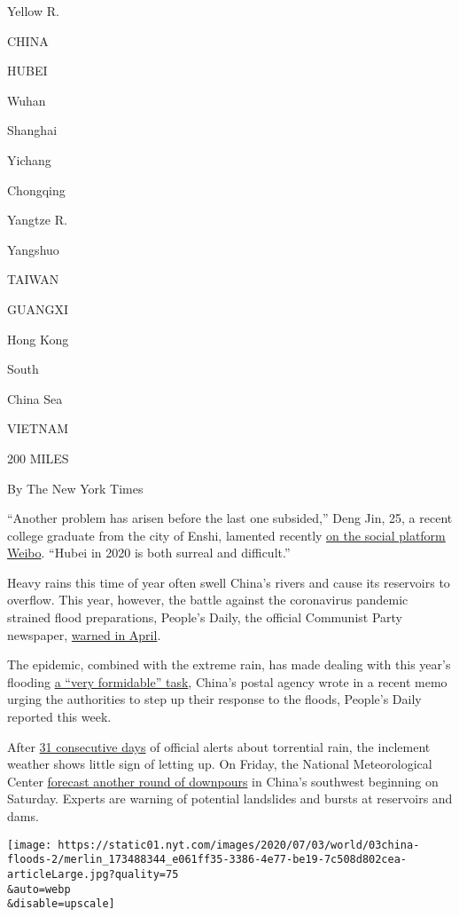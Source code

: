 Yellow R.

CHINA

HUBEI

Wuhan

Shanghai

Yichang

Chongqing

Yangtze R.

Yangshuo

TAIWAN

GUANGXI

Hong Kong

South

China Sea

VIETNAM

200 MILES

By The New York Times

``Another problem has arisen before the last one subsided,'' Deng Jin,
25, a recent college graduate from the city of Enshi, lamented recently
\href{https://m.weibo.cn/status/4520707848175659?}{on the social
platform Weibo}. ``Hubei in 2020 is both surreal and difficult.''

Heavy rains this time of year often swell China's rivers and cause its
reservoirs to overflow. This year, however, the battle against the
coronavirus pandemic strained flood preparations, People's Daily, the
official Communist Party newspaper,
\href{http://paper.people.com.cn/rmrb/html/2020-04/17/nw.D110000renmrb_20200417_3-06.htm}{warned
in April}.

The epidemic, combined with the extreme rain, has made dealing with this
year's flooding
\href{http://m.people.cn/n4/2020/0701/c175-14102526.html}{a ``very
formidable'' task}, China's postal agency wrote in a recent memo urging
the authorities to step up their response to the floods, People's Daily
reported this week.

After \href{https://mp.weixin.qq.com/s/a9pJCMb7WM5T52jXpJMHeQ}{31
consecutive days} of official alerts about torrential rain, the
inclement weather shows little sign of letting up. On Friday, the
National Meteorological Center
\href{http://www.nmc.cn/publish/weather-bulletin/index.htm}{forecast
another round of downpours} in China's southwest beginning on Saturday.
Experts are warning of potential landslides and bursts at reservoirs and
dams.

\texttt{[image: https://static01.nyt.com/images/2020/07/03/world/03china-floods-2/merlin\_173488344\_e061ff35-3386-4e77-be19-7c508d802cea-articleLarge.jpg?quality=75\\\&auto=webp\\\&disable=upscale]}

